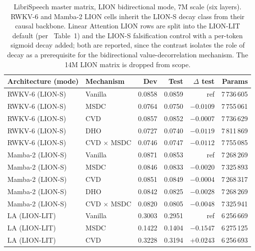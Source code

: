 \begin{table}[p]
\centering
\small
\caption[Master matrix on LibriSpeech, LION, 7M]{LibriSpeech master
matrix, LION bidirectional mode, 7M scale (six layers). RWKV-6 and
Mamba-2 LION cells inherit the LION-S decay class from their causal
backbone. Linear Attention LION rows are split into the LION-LIT
default (per~\citet{afzal2025linear} Table~1) and the LION-S
falsification control with a per-token sigmoid decay added; both
are reported, since the contrast isolates the role of decay as a
prerequisite for the bidirectional value-decorrelation mechanism.
The 14M LION matrix is dropped from scope.}
\label{tab:results:master-matrix-lion-7m}
\setlength{\tabcolsep}{6pt}
\renewcommand{\arraystretch}{1.15}
\begin{tabularx}{\linewidth}{@{}p{3.0cm} X r r r r@{}}
\toprule
\textbf{Architecture (mode)} & \textbf{Mechanism} &
\textbf{Dev} & \textbf{Test} & \textbf{$\Delta$ test} & \textbf{Params} \\
\midrule
RWKV-6 (LION-S)    & Vanilla         & 0.0858 & 0.0859 & ref       & 7\,736\,605 \\
RWKV-6 (LION-S)    & MSDC            & 0.0764 & 0.0750 & $-0.0109$ & 7\,755\,061 \\
RWKV-6 (LION-S)    & CVD             & 0.0857 & 0.0852 & $-0.0007$ & 7\,736\,629 \\
RWKV-6 (LION-S)    & DHO             & 0.0727 & 0.0740 & $-0.0119$ & 7\,811\,869 \\
RWKV-6 (LION-S)    & CVD $\times$ MSDC & 0.0746 & 0.0747 & $-0.0112$ & 7\,755\,085 \\
\addlinespace
Mamba-2 (LION-S)   & Vanilla         & 0.0871 & 0.0853 & ref       & 7\,268\,269 \\
Mamba-2 (LION-S)   & MSDC            & 0.0846 & 0.0833 & $-0.0020$ & 7\,325\,893 \\
Mamba-2 (LION-S)   & CVD             & 0.0851 & 0.0849 & $-0.0004$ & 7\,268\,317 \\
Mamba-2 (LION-S)   & DHO             & 0.0842 & 0.0825 & $-0.0028$ & 7\,268\,269 \\
Mamba-2 (LION-S)   & CVD $\times$ MSDC & 0.0820 & 0.0805 & $-0.0048$ & 7\,325\,941 \\
\addlinespace
LA (LION-LIT)      & Vanilla         & 0.3003 & 0.2951 & ref       & 6\,256\,669 \\
LA (LION-LIT)      & MSDC            & 0.1422 & 0.1404 & $-0.1547$ & 6\,275\,125 \\
LA (LION-LIT)      & CVD             & 0.3228 & 0.3194 & $+0.0243$ & 6\,256\,693 \\

\end{tabularx}
\end{table}

